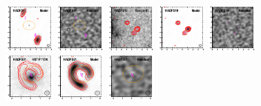 \documentclass[iop]{emulateapj}
\begin{document}
\begin{figure}[!tbp]
\begin{centering}
\includegraphics[width=0.162\textwidth]{../Figures/modelfit/HADFS11_model_bestfit.pdf}
\includegraphics[width=0.162\textwidth]{../Figures/modelfit/HADFS11_residual_bestfit.pdf}
\includegraphics[width=0.162\textwidth]{../Figures/modelfit/HADFS10_optical_bestfit.pdf}
\includegraphics[width=0.162\textwidth]{../Figures/modelfit/HADFS10_model_bestfit.pdf}
\includegraphics[width=0.162\textwidth]{../Figures/modelfit/HADFS10_residual_bestfit.pdf}
\includegraphics[width=0.162\textwidth]{../Figures/modelfit/HADFS01_optical_bestfit.pdf}
\includegraphics[width=0.162\textwidth]{../Figures/modelfit/HADFS01_model_bestfit.pdf}
\includegraphics[width=0.162\textwidth]{../Figures/modelfit/HADFS01_residual_bestfit.pdf}

\end{centering}
\end{figure}
\end{document}

